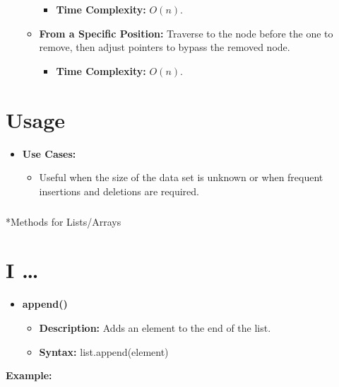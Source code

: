 \documentclass[
  letterpaper,
  DIV=11,
  numbers=noendperiod]{scrreprt}
\makeatletter
\let\oldsubparagraph\subparagraph
\renewcommand{\subparagraph}{
    \@ifstar
      \xxxSubParagraphStar
      \xxxSubParagraphNoStar
  }
\newcommand{\xxxSubParagraphStar}[1]{\oldsubparagraph*{#1}\mbox{}}
\newcommand{\xxxSubParagraphNoStar}[1]{\oldsubparagraph{#1}\mbox{}}
\providecommand{\tightlist}{%
  \setlength{\itemsep}{0pt}\setlength{\parskip}{0pt}}
\makeatother
\begin{document}
\begin{itemize}
\begin{itemize}
    \begin{itemize}
    \tightlist
    \item
      \textbf{Time Complexity:} \(O(n)\).
    \end{itemize}
  \item
    \textbf{From a Specific Position:} Traverse to the node before the
    one to remove, then adjust pointers to bypass the removed node.

    \begin{itemize}
    \tightlist
    \item
      \textbf{Time Complexity:} \(O(n)\).
    \end{itemize}
  \end{itemize}
\end{itemize}

\section{Usage}

\begin{itemize}
\item
  \textbf{Use Cases:}

  \begin{itemize}
  \tightlist
  \item
    Useful when the size of the data set is unknown or when frequent
    insertions and deletions are required.
  \end{itemize}
\end{itemize}

\subparagraph*{Methods for Lists/Arrays}\label{methods-for-listsarrays}

\section{I \ldots{}}

\begin{itemize}
\tightlist
\item
  \textbf{append()}

  \begin{itemize}
  \tightlist
  \item
    \textbf{Description:} Adds an element to the end of the list.
  \item
    \textbf{Syntax:} list.append(element)
  \end{itemize}
\end{itemize}

\textbf{Example:}
\end{document}
